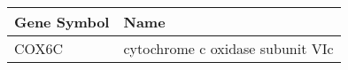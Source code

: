 \begin{tabular}{ll}
\toprule
Gene Symbol &                             Name \\
\midrule
      COX6C & cytochrome c oxidase subunit VIc \\
\bottomrule
\end{tabular}
